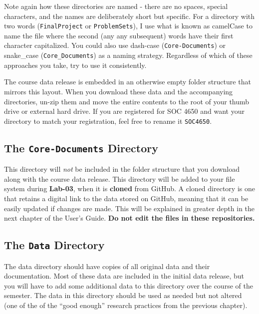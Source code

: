 \documentclass[]{book}
\theoremstyle{definition}
\theoremstyle{definition}
\theoremstyle{remark}
\begin{document}
Note again how these directories are named - there are no spaces,
special characters, and the names are deliberately short but specific.
For a directory with two words (\texttt{FinalProject} or
\texttt{ProblemSets}), I use what is known as camelCase to name the file
where the second (any any subsequent) words have their first character
capitalized. You could also use dash-case (\texttt{Core-Documents}) or
snake\_case (\texttt{Core\_Documents}) as a naming strategy. Regardless
of which of these approaches you take, try to use it consistently.

The course data release is embedded in an otherwise empty folder
structure that mirrors this layout. When you download these data and the
accompanying directories, un-zip them and move the entire contents to
the root of your thumb drive or external hard drive. If you are
registered for SOC 4650 and want your directory to match your
registration, feel free to rename it \texttt{SOC4650}.

\subsection{\texorpdfstring{The \texttt{Core-Documents}
Directory}{The Core-Documents Directory}}\label{the-core-documents-directory}

This directory will \emph{not} be included in the folder structure that
you download along with the course data release. This directory will be
added to your file system during \textbf{Lab-03}, when it is
\textbf{cloned} from GitHub. A cloned directory is one that retains a
digital link to the data stored on GitHub, meaning that it can be easily
updated if changes are made. This will be explained in greater depth in
the next chapter of the User's Guide. \textbf{Do not edit the files in
these repositories.}

\subsection{\texorpdfstring{The \texttt{Data}
Directory}{The Data Directory}}\label{the-data-directory}

The data directory should have copies of all original data and their
documentation. Most of these data are included in the initial data
release, but you will have to add some additional data to this directory
over the course of the semester. The data in this directory should be
used as needed but not altered (one of the of the ``good enough''
research practices from the previous chapter).
\end{document}
